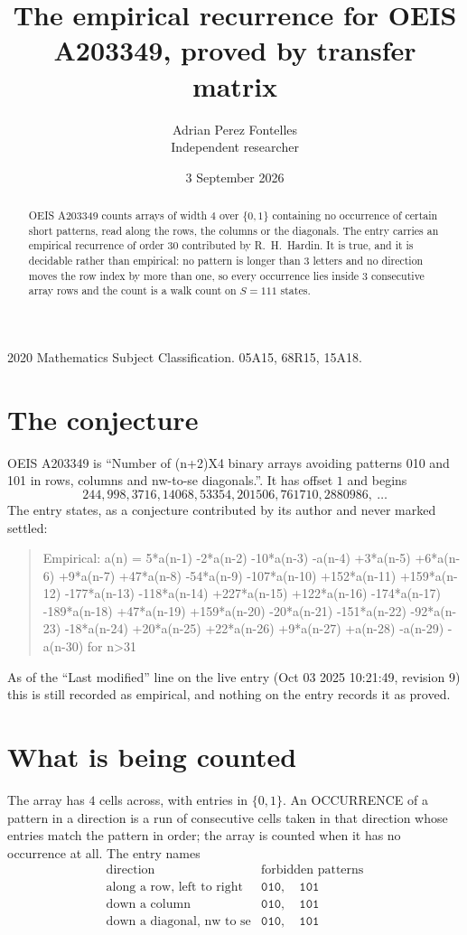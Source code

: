 \documentclass[11pt,a4paper]{article}
\title{The empirical recurrence for OEIS A203349, proved by transfer matrix}
\author{Adrian Perez Fontelles\\ \small Independent researcher}
\date{3 September 2026}
\theoremstyle{plain}
\theoremstyle{definition}
\begin{document}
\maketitle

\begin{abstract}
OEIS A203349 counts arrays of width $4$ over $\{0,1\}$ containing no occurrence of certain short
patterns, read along the rows, the columns or the diagonals. The entry carries an empirical
recurrence of order $30$ contributed by R.~H.~Hardin. It is true, and it is decidable
rather than empirical: no pattern is longer than $3$ letters and no direction moves the row
index by more than one, so every occurrence lies inside $3$ consecutive array rows and the
count is a walk count on $S=111$ states.
\end{abstract}

\noindent\small 2020 Mathematics Subject Classification. 05A15, 68R15, 15A18.\normalsize

\section{The conjecture}

OEIS A203349 is ``Number of (n+2)X4 binary arrays avoiding patterns 010 and 101 in rows, columns and nw-to-se diagonals.''. It has offset $1$ and begins
\[
244, 998, 3716, 14068, 53354, 201506, 761710, 2880986,\ \dots
\]
The entry states, as a conjecture contributed by its author and never marked settled:
\begin{quote}
Empirical: a(n) = 5*a(n-1) -2*a(n-2) -10*a(n-3) -a(n-4) +3*a(n-5) +6*a(n-6) +9*a(n-7) +47*a(n-8) -54*a(n-9) -107*a(n-10) +152*a(n-11) +159*a(n-12) -177*a(n-13) -118*a(n-14) +227*a(n-15) +122*a(n-16) -174*a(n-17) -189*a(n-18) +47*a(n-19) +159*a(n-20) -20*a(n-21) -151*a(n-22) -92*a(n-23) -18*a(n-24) +20*a(n-25) +22*a(n-26) +9*a(n-27) +a(n-28) -a(n-29) -a(n-30) for n>31
\end{quote}
As of the ``Last modified'' line on the live entry (Oct 03 2025 10:21:49, revision 9) this is still
recorded as empirical, and nothing on the entry records it as proved.

\section{What is being counted}

The array has $4$ cells across, with entries in $\{0,1\}$. An OCCURRENCE of a pattern in a
direction is a run of consecutive cells taken in that direction whose entries match the pattern
in order; the array is counted when it has no occurrence at all. The entry names
\[
\begin{array}{ll}
\text{direction} & \text{forbidden patterns} \\[2pt]
\text{along a row, left to right} & \mathtt{010},\quad \mathtt{101} \\
\text{down a column} & \mathtt{010},\quad \mathtt{101} \\
\text{down a diagonal, nw to se} & \mathtt{010},\quad \mathtt{101} \\
\end{array}
\]
\end{document}
